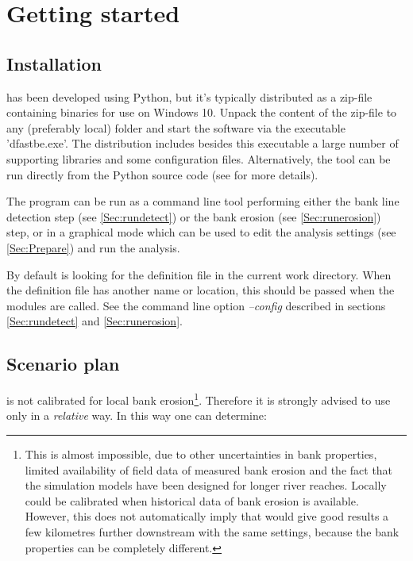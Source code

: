 \chapter{Getting started} \label{Chp:GetStarted}

\section{Installation}

\dfastbe has been developed using Python, but it's typically distributed as a zip-file containing binaries for use on Windows 10.
Unpack the content of the zip-file to any (preferably local) folder and start the software via the executable 'dfastbe.exe'.
The distribution includes besides this executable a large number of supporting libraries and some configuration files.
Alternatively, the tool can be run directly from the Python source code (see  for more details).

The program can be run as a command line tool performing either the bank line detection step (see \autoref{Sec:rundetect}) or the bank erosion (see \autoref{Sec:runerosion}) step, or in a graphical mode which can be used to edit the analysis settings (see \autoref{Sec:Prepare}) and run the analysis.

By default \dfastbe is looking for the definition file  in the current work directory.
When the definition file has another name or location, this should be passed when the modules are called.
See the command line option \emph{--config} described in sections \ref{Sec:rundetect} and \ref{Sec:runerosion}.

\section{Scenario plan}

\dfastbe is not calibrated for local bank erosion\footnote{This is almost impossible, due to other uncertainties in bank properties, limited availability of field data of measured bank erosion and the fact that the simulation models have been designed for longer river reaches.
Locally \dfastbe could be calibrated when historical data of bank erosion is available.
However, this does not automatically imply that \dfastbe would give good results a few kilometres further downstream with the same settings, because the bank properties can be completely different.}.
Therefore it is strongly advised to use \dfastbe only in a \emph{relative} way.
In this way one can determine:

